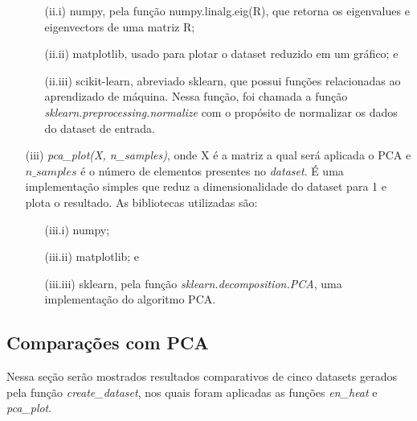 \documentclass[a4paper,12pt]{article}    %
\begin{document}
\begin{itemize}
\begin{itemize}
			\item[(ii.i)] numpy, pela função numpy.linalg.eig(R), que retorna os eigenvalues e eigenvectors de uma matriz R;
			\item[(ii.ii)] matplotlib, usado para plotar o dataset reduzido em um gráfico; e
			\item[(ii.iii)] scikit-learn, abreviado sklearn, que possui funções relacionadas ao aprendizado de máquina. Nessa função, foi chamada a função \textit{sklearn.preprocessing.normalize} com o propósito de normalizar os dados do dataset de entrada.
		\end{itemize}
	\item[(iii)] \textit{pca\_plot(X, n\_samples)}, onde X é a matriz a qual será aplicada o PCA e $n\_samples$ é o número de elementos presentes no \textit{dataset}. É uma implementação simples que reduz a dimensionalidade do dataset para 1 e plota o resultado. As bibliotecas utilizadas são:
		\begin{itemize}
			\item[(iii.i)] numpy;
			\item[(iii.ii)] matplotlib; e
			\item[(iii.iii)] sklearn, pela função \textit{sklearn.decomposition.PCA}, uma implementação do algoritmo PCA.
		\end{itemize}
\end{itemize}

\newpage
\subsection{Comparações com PCA}

Nessa seção serão mostrados resultados comparativos de cinco datasets gerados pela função \textit{create\_dataset}, nos quais foram aplicadas as funções \textit{en\_heat} e \textit{pca\_plot}.
\end{document}
